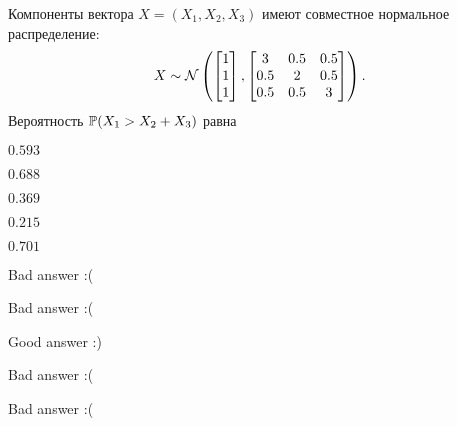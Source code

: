 
\begin{question}
Компоненты вектора \(X=(X_{1},X_{2},X_{3})\) имеют совместное нормальное
распределение: \[
X\sim\cN \left(
\begin{bmatrix}1\\1\\1\end{bmatrix},
\begin{bmatrix}3 & 0.5 & 0.5\\0.5 & 2 & 0.5\\0.5 & 0.5 & 3\end{bmatrix}
\right).
\] Вероятность \(\P(X_{1}>X_{2}+X_{3} )\) равна
\begin{answerlist}
  \item \(0.593\)
  \item \(0.688\)
  \item \(0.369\)
  \item \(0.215\)
  \item \(0.701\)
\end{answerlist}
\end{question}

\begin{solution}
\begin{answerlist}
  \item Bad answer :(
  \item Bad answer :(
  \item Good answer :)
  \item Bad answer :(
  \item Bad answer :(
\end{answerlist}
\end{solution}

